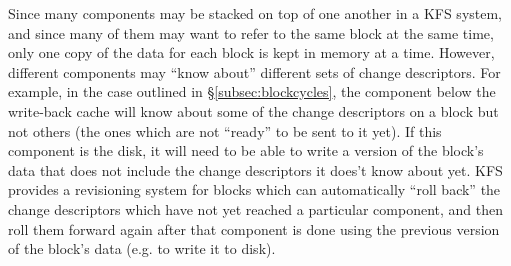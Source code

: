 Since many components may be stacked on top of one another in a KFS system, and
since many of them may want to refer to the same block at the same time, only
one copy of the data for each block is kept in memory at a time. However,
different components may ``know about'' different sets of change descriptors.
For example, in the case outlined in \S\ref{subsec:blockcycles}, the component
below the write-back cache will know about some of the change descriptors on a
block but not others (the ones which are not ``ready'' to be sent to it yet). If
this component is the disk, it will need to be able to write a version of the
block's data that does not include the change descriptors it does't know about
yet. KFS provides a revisioning system for blocks which can automatically ``roll
back'' the change descriptors which have not yet reached a particular component,
and then roll them forward again after that component is done using the previous
version of the block's data (e.g. to write it to disk).

